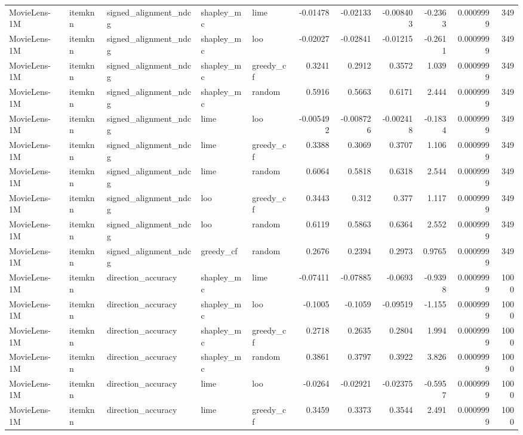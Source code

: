 \begin{table}[t]
\begin{tabular}{lllllrrrrrr}
MovieLens-1M & itemknn & signed\_alignment\_ndcg & shapley\_mc & lime & -0.01478 & -0.02133 & -0.008403 & -0.2363 & 0.0009999 & 349 \\
MovieLens-1M & itemknn & signed\_alignment\_ndcg & shapley\_mc & loo & -0.02027 & -0.02841 & -0.01215 & -0.2611 & 0.0009999 & 349 \\
MovieLens-1M & itemknn & signed\_alignment\_ndcg & shapley\_mc & greedy\_cf & 0.3241 & 0.2912 & 0.3572 & 1.039 & 0.0009999 & 349 \\
MovieLens-1M & itemknn & signed\_alignment\_ndcg & shapley\_mc & random & 0.5916 & 0.5663 & 0.6171 & 2.444 & 0.0009999 & 349 \\
MovieLens-1M & itemknn & signed\_alignment\_ndcg & lime & loo & -0.005492 & -0.008726 & -0.002418 & -0.1834 & 0.0009999 & 349 \\
MovieLens-1M & itemknn & signed\_alignment\_ndcg & lime & greedy\_cf & 0.3388 & 0.3069 & 0.3707 & 1.106 & 0.0009999 & 349 \\
MovieLens-1M & itemknn & signed\_alignment\_ndcg & lime & random & 0.6064 & 0.5818 & 0.6318 & 2.544 & 0.0009999 & 349 \\
MovieLens-1M & itemknn & signed\_alignment\_ndcg & loo & greedy\_cf & 0.3443 & 0.312 & 0.377 & 1.117 & 0.0009999 & 349 \\
MovieLens-1M & itemknn & signed\_alignment\_ndcg & loo & random & 0.6119 & 0.5863 & 0.6364 & 2.552 & 0.0009999 & 349 \\
MovieLens-1M & itemknn & signed\_alignment\_ndcg & greedy\_cf & random & 0.2676 & 0.2394 & 0.2973 & 0.9765 & 0.0009999 & 349 \\
MovieLens-1M & itemknn & direction\_accuracy & shapley\_mc & lime & -0.07411 & -0.07885 & -0.0693 & -0.9398 & 0.0009999 & 1000 \\
MovieLens-1M & itemknn & direction\_accuracy & shapley\_mc & loo & -0.1005 & -0.1059 & -0.09519 & -1.155 & 0.0009999 & 1000 \\
MovieLens-1M & itemknn & direction\_accuracy & shapley\_mc & greedy\_cf & 0.2718 & 0.2635 & 0.2804 & 1.994 & 0.0009999 & 1000 \\
MovieLens-1M & itemknn & direction\_accuracy & shapley\_mc & random & 0.3861 & 0.3797 & 0.3922 & 3.826 & 0.0009999 & 1000 \\
MovieLens-1M & itemknn & direction\_accuracy & lime & loo & -0.0264 & -0.02921 & -0.02375 & -0.5957 & 0.0009999 & 1000 \\
MovieLens-1M & itemknn & direction\_accuracy & lime & greedy\_cf & 0.3459 & 0.3373 & 0.3544 & 2.491 & 0.0009999 & 1000 \\

\end{tabular}
\end{table}
